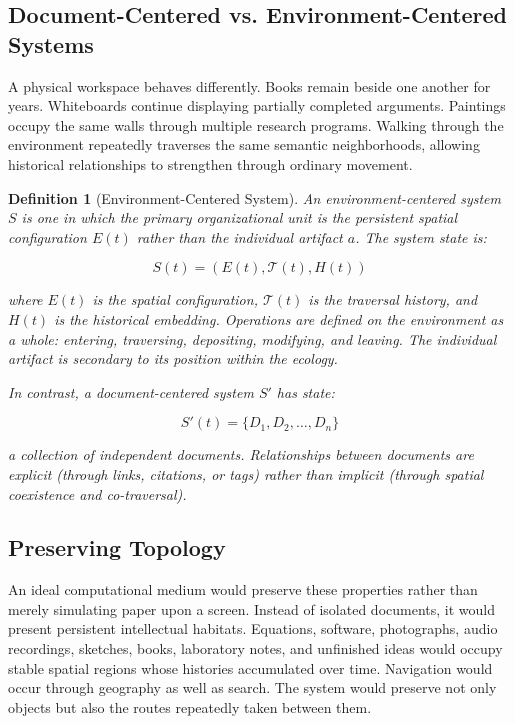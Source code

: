 \documentclass[12pt,oneside]{article}
\newtheorem{definition}{Definition}[section]
\theoremstyle{remark}
\begin{document}
\subsection{Document-Centered vs. Environment-Centered Systems}

A physical workspace behaves differently. Books remain beside one another for years. Whiteboards continue displaying partially completed arguments. Paintings occupy the same walls through multiple research programs. Walking through the environment repeatedly traverses the same semantic neighborhoods, allowing historical relationships to strengthen through ordinary movement.

\begin{definition}[Environment-Centered System]
An environment-centered system $S$ is one in which the primary organizational unit is the persistent spatial configuration $E(t)$ rather than the individual artifact $a$. The system state is:

\begin{equation}
S(t) = (E(t), \mathcal{T}(t), H(t))
\end{equation}

where $E(t)$ is the spatial configuration, $\mathcal{T}(t)$ is the traversal history, and $H(t)$ is the historical embedding. Operations are defined on the environment as a whole: entering, traversing, depositing, modifying, and leaving. The individual artifact is secondary to its position within the ecology.

In contrast, a document-centered system $S'$ has state:

\begin{equation}
S'(t) = \{D_1, D_2, \ldots, D_n\}
\end{equation}

a collection of independent documents. Relationships between documents are explicit (through links, citations, or tags) rather than implicit (through spatial coexistence and co-traversal).
\end{definition}

\subsection{Preserving Topology}

An ideal computational medium would preserve these properties rather than merely simulating paper upon a screen. Instead of isolated documents, it would present persistent intellectual habitats. Equations, software, photographs, audio recordings, sketches, books, laboratory notes, and unfinished ideas would occupy stable spatial regions whose histories accumulated over time. Navigation would occur through geography as well as search. The system would preserve not only objects but also the routes repeatedly taken between them.
\end{document}
